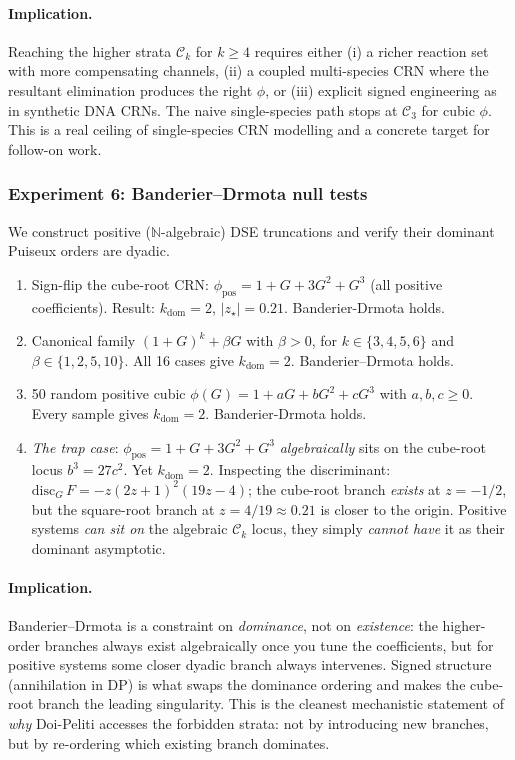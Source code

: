 \documentclass[11pt,a4paper]{article}
\theoremstyle{plain}
\theoremstyle{definition}
\begin{document}
\paragraph{Implication.}
Reaching the higher strata $\mathcal{C}_{k}$ for $k\geq 4$
requires either (i) a richer reaction set with more
compensating channels, (ii) a coupled multi-species CRN where
the resultant elimination produces the right $\phi$, or (iii)
explicit signed engineering as in synthetic DNA CRNs.  The
naive single-species path stops at $\mathcal{C}_{3}$ for cubic
$\phi$.  This is a real ceiling of single-species CRN modelling
and a concrete target for follow-on work.

\subsubsection*{Experiment 6: Banderier--Drmota null tests}

We construct positive ($\mathbb{N}$-algebraic) DSE truncations
and verify their dominant Puiseux orders are dyadic.

\begin{enumerate}[label=(\alph*),leftmargin=1.2em]
\item Sign-flip the cube-root CRN: $\phi_{\text{pos}} = 1 + G +
  3G^{2} + G^{3}$ (all positive coefficients).  Result:
  $k_{\text{dom}} = 2$, $|z_{\star}|=0.21$.  Banderier-Drmota
  holds.
\item Canonical family $(1+G)^{k} + \beta G$ with $\beta > 0$,
  for $k\in\{3,4,5,6\}$ and $\beta\in\{1,2,5,10\}$.  All 16
  cases give $k_{\text{dom}} = 2$.  Banderier--Drmota holds.
\item 50 random positive cubic $\phi(G) = 1 + aG + bG^{2}+cG^{3}$
  with $a, b, c \geq 0$.  Every sample gives $k_{\text{dom}} = 2$.
  Banderier-Drmota holds.
\item \emph{The trap case}: $\phi_{\text{pos}} = 1 + G + 3G^{2} +
  G^{3}$ \emph{algebraically} sits on the cube-root locus
  $b^{3} = 27c^{2}$.  Yet $k_{\text{dom}} = 2$.  Inspecting the
  discriminant: $\mathrm{disc}_{G}\,F = -z(2z+1)^{2}(19z-4)$;
  the cube-root branch \emph{exists} at $z=-1/2$, but the
  square-root branch at $z=4/19\approx 0.21$ is closer to the
  origin.  Positive systems \emph{can sit on} the algebraic
  $\mathcal{C}_{k}$ locus, they simply \emph{cannot have} it as
  their dominant asymptotic.
\end{enumerate}

\paragraph{Implication.}
Banderier--Drmota is a constraint on \emph{dominance}, not on
\emph{existence}: the higher-order branches always exist
algebraically once you tune the coefficients, but for positive
systems some closer dyadic branch always intervenes.  Signed
structure (annihilation in DP) is what swaps the dominance
ordering and makes the cube-root branch the leading singularity.
This is the cleanest mechanistic statement of \emph{why}
Doi-Peliti accesses the forbidden strata: not by introducing
new branches, but by re-ordering which existing branch dominates.
\end{document}
